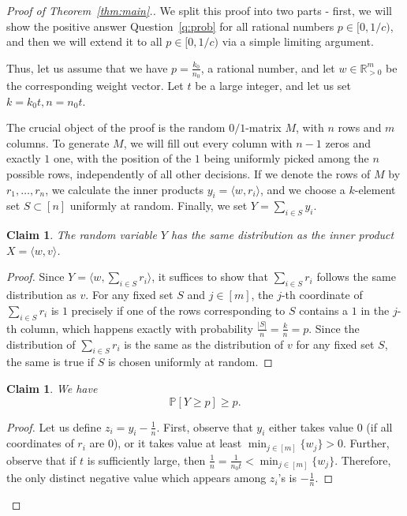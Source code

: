 \documentclass[11pt]{amsart}
\newtheorem{claim}[theorem]{\bf Claim}
\theoremstyle{definition}
\newenvironment{claimproof}{%
  \renewcommand{\qedsymbol}{$\boxdot$}%
  \begin{proof}%
}{%
  \end{proof}%
  \renewcommand{\qedsymbol}{$\square$}%
}
\def\bR{\mathbb{R}}
\def\Pb{\mathbb{P}}
\begin{document}
\begin{proof}[Proof of Theorem~\ref{thm:main}.]
We split this proof into two parts - first, we will show the positive answer Question~\ref{q:prob} for all rational numbers $p\in [0, 1/c)$, and then we will extend it to all $p\in [0, 1/c)$ via a simple limiting argument.

Thus, let us assume that we have $p=\frac{k_0}{n_0}$, a rational number, and let $w\in \bR_{>0}^m$ be the corresponding weight vector. Let $t$ be a large integer, and let us set $k=k_0t, n=n_0t$.

The crucial object of the proof is the random $0/1$-matrix $M$, with $n$ rows and $m$ columns. To generate $M$, we will fill out every column with $n-1$ zeros and exactly $1$ one, with the position of the $1$ being uniformly picked among the $n$ possible rows, independently of all other decisions. If we denote the rows of $M$ by $r_1, \dots, r_n$, we calculate the inner products $y_i=\langle w, r_i\rangle$, and we choose a $k$-element set $S\subset [n]$ uniformly at random. Finally, we set $Y=\sum_{i\in S}y_i$. 

\begin{claim}
The random variable $Y$ has the same distribution as the inner product $X=\langle w, v\rangle$.
\end{claim}
\begin{claimproof}
Since $Y=\langle w, \sum_{i\in S}r_i\rangle$, it suffices to show that $\sum_{i\in S}r_i$ follows the same distribution as $v$. For any fixed set $S$ and $j\in [m]$, the $j$-th coordinate of $\sum_{i\in S}r_i$ is $1$ precisely if one of the rows corresponding to $S$ contains a $1$ in the $j$-th column, which happens exactly with probability $\frac{|S|}{n}=\frac{k}{n}=p$. Since the distribution of $\sum_{i\in S}r_i$ is the same as the distribution of $v$ for any fixed set $S$, the same is true if $S$ is chosen uniformly at random.
\end{claimproof}

\begin{claim}
We have \[\Pb[Y\geq p]\geq p.\]
\end{claim}
\begin{claimproof}
Let us define $z_i=y_i-\frac{1}{n}$. First, observe that $y_i$ either takes value $0$ (if all coordinates of $r_i$ are $0$), or it takes value at least $\min_{j\in [m]}\{w_j\}>0$. Further, observe that if $t$ is sufficiently large, then $\frac{1}{n}=\frac{1}{n_0t}<\min_{j\in [m]}\{w_j\}$. Therefore, the only distinct negative value which appears among $z_i$'s is $-\frac{1}{n}$.


\end{claimproof}
\end{proof}
\end{document}

